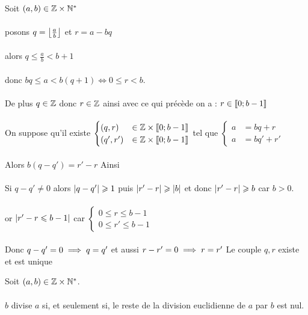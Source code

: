 \begin{dem}
	Soit \((a,b)\in \mathbb{Z} \times \mathbb{N}^*\)\\~\\
	\existence posons \(q = \left\lfloor\frac{a}{b}\right\rfloor\) et \(r = a-bq\)\\~\\
	alors \(q\leq \frac{a}{b}<b+1\)\\~\\
	donc \(bq\leq a < b(q+1) \iff 0\leq r<b\).\\~\\
	De plus \(q \in \mathbb{Z}\) donc \(r \in \mathbb{Z}\) ainsi avec ce qui précède on a : \(r \in \left\llbracket0;b-1\right\rrbracket\)\\~\\
	\unicite On suppose qu'il existe \(\begin{cases}
		(q,r)   & \in \mathbb{Z} \times \left\llbracket0;b-1\right\rrbracket \\
		(q',r') & \in \mathbb{Z} \times \left\llbracket0;b-1\right\rrbracket \\
	\end{cases}\) tel que \(\begin{cases}
		a & = bq+r   \\
		a & = bq'+r'
	\end{cases}\)
	\\~\\
	Alors \(b(q-q') = r'-r\) Ainsi\\~\\
	Si \(q-q' \neq 0\) alors \(\left\lvert q-q'\right\rvert\geqslant 1\) puis \(\left\lvert r'-r\right\rvert\geqslant \left\lvert b\right\rvert\) et donc \(\left\lvert r'-r\right\rvert\geqslant b\) car \(b>0\).\\~\\
	or \(\left\lvert r'-r\leqslant b-1\right\rvert\) car \(\begin{cases}
		0\leq r \leq b-1 \\
		0\leq r' \leq b-1
	\end{cases}\) \\~\\
	Donc \(q-q' = 0 \implies q=q'\) et aussi \(r-r' = 0\implies r = r'\)
	\conclusion Le couple \(q,r\) existe et est unique
\end{dem}


\begin{defprop}
	Soit \((a, b) \in \mathbb{Z} \times \mathbb{N}^*\).\\~\\
	\(b\) divise \(a\) si, et seulement si, le reste de la division euclidienne de \(a\) par \(b\) est nul.
\end{defprop}

